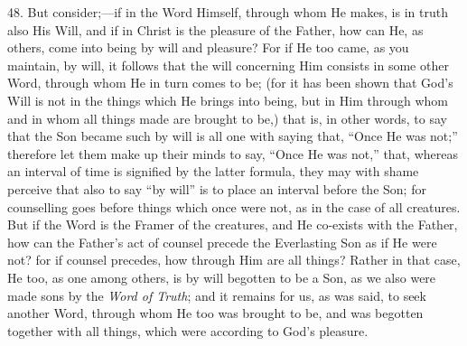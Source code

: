 48. But consider;—if in the
Word Himself, through whom He makes, is in truth also His Will, and if
in Christ is the pleasure of the Father, how can He, as others, come
into being by will and pleasure? For if He too came, as you maintain,
by will, it follows that the will concerning Him consists in some
other Word, through whom He in turn comes to be; (for it has been
shown that God's Will is not in the things which He brings into being,
but in Him through whom and in whom all things made are brought to
be,) that is, in other words, to say that the Son became such by will
is all one with saying that, ``Once He was not;'' therefore let them
make up their minds to say, ``Once He was not,'' that, whereas an
interval of time is signified by the latter formula, they may with
shame perceive that also to say ``by will'' is to place an interval
before the Son; for counselling goes before things which once were
not, as in the case of all creatures. But if the Word is the Framer of
the creatures, and He co-exists with the Father, how can the Father's
act of counsel precede the Everlasting Son as if He were not? for if
counsel precedes, how through Him are all things? Rather in that case,
He too, as one among others, is by will begotten to be a Son, as we
also were made sons by the \emph{Word of Truth}; and it remains
for us, as was said, to seek another Word, through whom He too was
brought to be, and was begotten together with all things, which were
according to God's pleasure.

